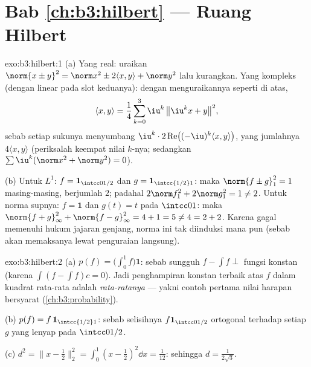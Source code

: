 \section*{Bab \ref{ch:b3:hilbert} --- Ruang Hilbert}

\begin{solution}{exo:b3:hilbert:1}
(a) Yang real: uraikan $\norm{x \pm y}^2 = \norm x^2 \pm 2\langle
x,y\rangle + \norm y^2$ lalu kurangkan. Yang kompleks (dengan 
linear pada slot keduanya): dengan menguraikannya seperti di atas,
\[
\langle x, y\rangle = \frac14\sum_{k=0}^{3}
\iu^k\,\bigl\|\iu^kx + y\bigr\|^2,
\]
sebab setiap sukunya menyumbang $\iu^k\cdot2\operatorname{Re}\bigl(
(-\iu)^k\langle x,y\rangle\bigr)$, yang jumlahnya $4\langle
x,y\rangle$ (periksalah keempat nilai $k$-nya; sedangkan $\sum\iu^k
(\norm x^2 + \norm y^2) = 0$).

(b) Untuk $L^1$: $f = \mathbf 1_{\intcc0{1/2}}$ dan $g = \mathbf
1_{\intcc{1/2}1}$: maka $\norm{f\pm g}_1^2 = 1$ masing-masing, berjumlah $2$;
padahal $2\norm f_1^2 + 2\norm g_1^2 = 1 \neq 2$. Untuk norma supnya: $f =
\mathbf 1$ dan $g(t) = t$ pada $\intcc01$: maka $\norm{f + g}_\infty^2 +
\norm{f-g}_\infty^2 = 4 + 1 = 5 \neq 4 = 2 + 2$. Karena gagal memenuhi
hukum jajaran genjang, norma ini tak diinduksi  mana pun
(sebab  akan memaksanya lewat penguraian langsung).
\end{solution}

\begin{solution}{exo:b3:hilbert:2}
(a) $p(f) = \bigl(\int_0^1f\bigr)\mathbf 1$: sebab sungguh $f - \int f
\perp$ fungsi konstan (karena $\int(f - \int f)c = 0$). Jadi penghampiran
konstan terbaik atas $f$ dalam kuadrat rata-rata adalah \emph{rata-ratanya} ---
yakni contoh pertama nilai harapan bersyarat
(\cref{ch:b3:probability}).

(b) $p(f) = f\,\mathbf 1_{\intcc{1/2}1}$: sebab selisihnya
$f\mathbf 1_{\intcc0{1/2}}$ ortogonal terhadap setiap $g$ yang
lenyap pada $\intcc0{1/2}$.

(c) $d^2 = \bigl\|x - \tfrac12\bigr\|_2^2 = \int_0^1(x -
\tfrac12)^2\dd x = \tfrac1{12}$: sehingga $d = \frac1{2\sqrt3}$.
\end{solution}

